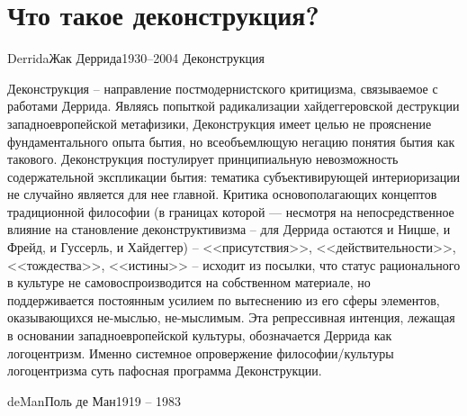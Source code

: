 \documentclass[aspectratio=169]{beamer}
\begin{document}
\section{Что такое деконструкция?}

\begin{Person}{Derrida}{Жак Деррида}{1930--2004}
Деконструкция  
\end{Person}

\begin{frame}
Деконструкция -- направление постмодернистского критицизма, связываемое с работами Деррида. Являясь попыткой радикализации хайдеггеровской деструкции западноевропейской метафизики, Деконструкция имеет целью не прояснение фундаментального опыта бытия, но всеобъемлющую негацию понятия бытия как такового. Деконструкция постулирует принципиальную невозможность содержательной экспликации бытия: тематика субъективирующей интериоризации не случайно является для нее главной. Критика основополагающих концептов традиционной философии (в границах которой — несмотря на непосредственное влияние на становление деконструктивизма -- для Деррида остаются и Ницше, и Фрейд, и Гуссерль, и Хайдеггер) -- <<присутствия>>, <<действительности>>, <<тождества>>, <<истины>> -- исходит из посылки, что статус рационального в культуре не самовоспроизводится на собственном материале, но поддерживается постоянным усилием по вытеснению из его сферы элементов, оказывающихся не-мыслью, не-мыслимым. Эта репрессивная интенция, лежащая в основании западноевропейской культуры, обозначается Деррида как логоцентризм. Именно системное опровержение философии/культуры логоцентризма суть пафосная  программа Деконструкции.
\end{frame}

\begin{Person}{deMan}{Поль де Ман}{1919 -- 1983}
\end{Person}
\end{document}
